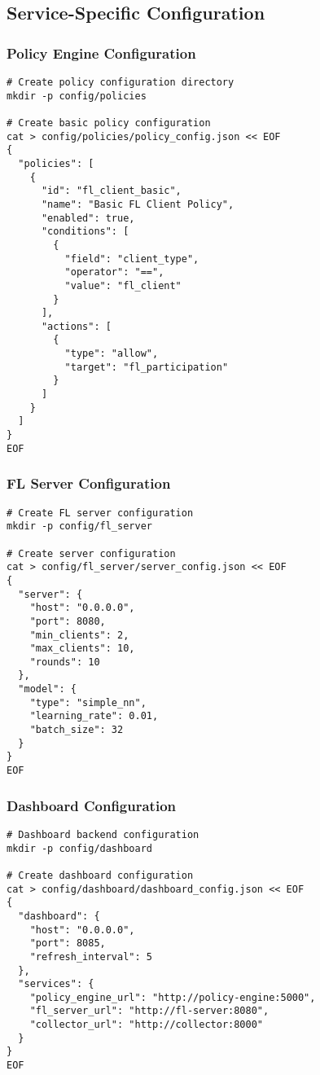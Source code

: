 \subsection{Service-Specific Configuration}

\subsubsection{Policy Engine Configuration}

\begin{lstlisting}[style=bashcode, caption=Policy Engine Setup]
# Create policy configuration directory
mkdir -p config/policies

# Create basic policy configuration
cat > config/policies/policy_config.json << EOF
{
  "policies": [
    {
      "id": "fl_client_basic",
      "name": "Basic FL Client Policy",
      "enabled": true,
      "conditions": [
        {
          "field": "client_type",
          "operator": "==",
          "value": "fl_client"
        }
      ],
      "actions": [
        {
          "type": "allow",
          "target": "fl_participation"
        }
      ]
    }
  ]
}
EOF
\end{lstlisting}

\subsubsection{FL Server Configuration}

\begin{lstlisting}[style=bashcode, caption=FL Server Setup]
# Create FL server configuration
mkdir -p config/fl_server

# Create server configuration
cat > config/fl_server/server_config.json << EOF
{
  "server": {
    "host": "0.0.0.0",
    "port": 8080,
    "min_clients": 2,
    "max_clients": 10,
    "rounds": 10
  },
  "model": {
    "type": "simple_nn",
    "learning_rate": 0.01,
    "batch_size": 32
  }
}
EOF
\end{lstlisting}

\subsubsection{Dashboard Configuration}

\begin{lstlisting}[style=bashcode, caption=Dashboard Setup]
# Dashboard backend configuration
mkdir -p config/dashboard

# Create dashboard configuration
cat > config/dashboard/dashboard_config.json << EOF
{
  "dashboard": {
    "host": "0.0.0.0",
    "port": 8085,
    "refresh_interval": 5
  },
  "services": {
    "policy_engine_url": "http://policy-engine:5000",
    "fl_server_url": "http://fl-server:8080",
    "collector_url": "http://collector:8000"
  }
}
EOF
\end{lstlisting}

